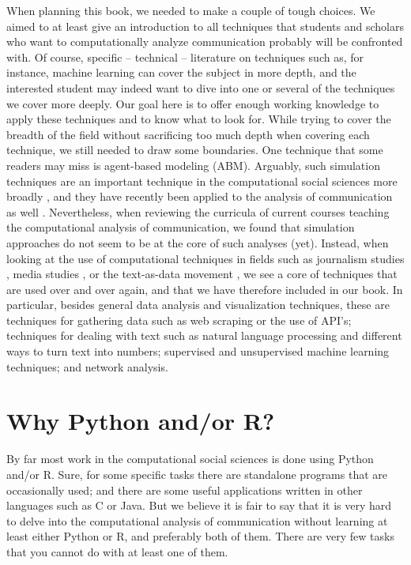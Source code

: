 When planning this book, we needed to make a couple of tough
choices. We aimed to at least give an introduction to all techniques
that students and scholars who want to computationally analyze
communication probably will be confronted with. Of course, specific --
technical -- literature on techniques such as, for instance, machine
learning can cover the subject in more depth, and the interested student may indeed
want to dive into one or several of the techniques we cover more
deeply. Our goal here is to offer enough working knowledge to apply
these techniques and to know what to look for.  While trying to cover
the breadth of the field without sacrificing too much depth when
covering each technique, we still needed to draw some boundaries. One
technique that some readers may miss is agent-based modeling
(ABM). Arguably, such simulation techniques are an important technique
in the computational social sciences more broadly
\citep{cioffi-revilla2014}, and they have recently been applied to the
analysis of communication as well
\citep{Waldherr2014,Wettstein2020}. Nevertheless, when reviewing the
curricula of current courses teaching the computational analysis of
communication, we found that simulation approaches do not seem to be at the core of
such analyses (yet).  Instead, when looking at the use of computational
techniques in fields such as journalism studies
\citep[e.g.,][]{Boumans2016}, media studies \citep[e.g.,][]{Rieder2017}, or
the text-as-data movement \citep{Grimmer2013}, we see a core of
techniques that are used  over and over again, and that we have therefore
included in our book. In particular, besides general data analysis and visualization techniques,
these are techniques for
gathering data such as web scraping or the use of API's; techniques
for dealing with text such as natural language processing and
different ways to turn text into numbers; supervised and unsupervised
machine learning techniques; and network analysis.

%


\section{Why Python and/or R?}
By far most work in the computational social sciences is done using
Python and/or R. Sure, for some specific tasks there are standalone
programs that are occasionally used; and there are some useful applications
written in other languages such as C or Java. But we believe it is
fair to say that it is very hard to delve into the computational analysis
of communication without learning at least either Python or R, and
preferably  both of them.
There are very few tasks that you cannot do with at least one of them.

